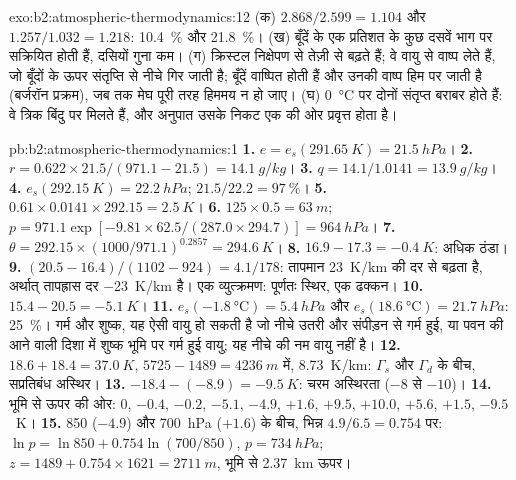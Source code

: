 \begin{solution}{exo:b2:atmospheric-thermodynamics:12}
(क) $2.868/2.599 = 1.104$ और $1.257/1.032 = 1.218$: \qty{10.4}{\percent} और
\qty{21.8}{\percent}। (ख) बूँदें  के एक प्रतिशत के कुछ दसवें भाग पर सक्रियित होती हैं,
दसियों गुना कम। (ग) क्रिस्टल निक्षेपण से तेज़ी से बढ़ते हैं; वे वायु से वाष्प लेते हैं,
जो बूँदों के ऊपर संतृप्ति से नीचे गिर जाती है; बूँदें वाष्पित होती हैं और उनकी वाष्प
हिम पर जाती है (बर्जरॉन प्रक्रम), जब तक मेघ पूरी तरह हिममय न हो जाए। (घ) \qty{0}{\celsius} पर दोनों
संतृप्त  बराबर होते हैं: वे त्रिक बिंदु पर मिलते हैं, और अनुपात उसके निकट
एक की ओर प्रवृत्त होता है।
\end{solution}

\begin{solution}{pb:b2:atmospheric-thermodynamics:1}
\textbf{1.} $e = e_s(\qty{291.65}{K}) = \qty{21.5}{hPa}$।
\textbf{2.} $r = 0.622 \times 21.5/(971.1 - 21.5) = \qty{14.1}{g/kg}$।
\textbf{3.} $q = 14.1/1.0141 = \qty{13.9}{g/kg}$।
\textbf{4.} $e_s(\qty{292.15}{K}) = \qty{22.2}{hPa}$; $21.5/22.2 = \qty{97}{\percent}$।
\textbf{5.} $0.61 \times 0.0141 \times 292.15 = \qty{2.5}{K}$।
\textbf{6.} $125 \times 0.5 = \qty{63}{m}$; $p = 971.1 \exp[-9.81 \times 62.5/(287.0 \times 294.7)]
= \qty{964}{hPa}$।
\textbf{7.} $\theta = 292.15 \times (1000/971.1)^{0.2857} = \qty{294.6}{K}$।
\textbf{8.} $16.9 - 17.3 = \qty{-0.4}{K}$: अधिक ठंडा।
\textbf{9.} $(20.5 - 16.4)/(1102 - 924) = 4.1/178$: तापमान \qty{23}{K/km} की दर से बढ़ता है,
अर्थात् तापह्रास दर \qty{-23}{K/km} है। एक व्युत्क्रमण: पूर्णतः स्थिर, एक ढक्कन।
\textbf{10.} $15.4 - 20.5 = \qty{-5.1}{K}$।
\textbf{11.} $e_s(\qty{-1.8}{\celsius}) = \qty{5.4}{hPa}$ और $e_s(\qty{18.6}{\celsius}) =
\qty{21.7}{hPa}$: \qty{25}{\percent}। गर्म और शुष्क, यह ऐसी वायु हो सकती है जो नीचे उतरी और संपीड़न
से गर्म हुई, या पवन की आने वाली दिशा में शुष्क भूमि पर गर्म हुई वायु; यह नीचे की नम वायु नहीं है।
\textbf{12.} $18.6 + 18.4 = \qty{37.0}{K}$, $5725 - 1489 = \qty{4236}{m}$ में, \qty{8.73}{K/km}: $\Gamma_s$ और
$\Gamma_d$ के बीच, सप्रतिबंध अस्थिर।
\textbf{13.} $-18.4 - (-8.9) = \qty{-9.5}{K}$: चरम अस्थिरता ($-8$ से $-10$)।
\textbf{14.} भूमि से ऊपर की ओर: 0, $-0.4$, $-0.2$, $-5.1$, $-4.9$, $+1.6$, $+9.5$, $+10.0$,
$+5.6$, $+1.5$, $-9.5$~\unit{K}।
\textbf{15.} 850 ($-4.9$) और \qty{700}{hPa} ($+1.6$) के बीच, भिन्न $4.9/6.5 = 0.754$ पर:
$\ln p = \ln 850 + 0.754 \ln(700/850)$, $p = \qty{734}{hPa}$; $z = 1489 + 0.754 \times 1621 =
\qty{2711}{m}$, भूमि से \qty{2.37}{km} ऊपर।

\end{solution}
